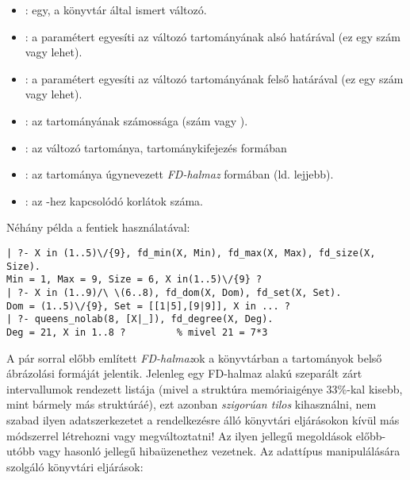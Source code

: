 \begin{itemize}
\item {}:  egy, a \clpfd könyvtár által ismert változó.
\item {}: a  paramétert egyesíti az 
változó tartományának alsó határával (ez egy szám vagy  lehet).
\item {}: a  paramétert egyesíti az 
változó tartományának felső határával (ez egy szám vagy  lehet).
\item {}:  az  tartományának számossága
(szám vagy ).
\item {}:  az  változó tartománya,
tartománykifejezés formában 
\item {}:  az  tartománya úgynevezett
\emph{FD-halmaz} formában (ld. lejjebb).
\item {}:  az -hez kapcsolódó korlátok
száma.
\end{itemize}

Néhány példa a fentiek használatával:

\begin{verbatim}
| ?- X in (1..5)\/{9}, fd_min(X, Min), fd_max(X, Max), fd_size(X, Size).
Min = 1, Max = 9, Size = 6, X in(1..5)\/{9} ? 
| ?- X in (1..9)/\ \(6..8), fd_dom(X, Dom), fd_set(X, Set).
Dom = (1..5)\/{9}, Set = [[1|5],[9|9]], X in ... ?
| ?- queens_nolab(8, [X|_]), fd_degree(X, Deg).
Deg = 21, X in 1..8 ?         % mivel 21 = 7*3
\end{verbatim}

A pár sorral előbb említett \emph{FD-halmaz}ok a \clpfd könyvtárban a
tartományok belső ábrázolási formáját jelentik. Jelenleg egy FD-halmaz
 alakú szeparált zárt intervallumok rendezett listája (mivel
a  struktúra memóriaigénye 33\%-kal kisebb, mint bármely más
 struktúráé), ezt azonban \emph{szigorúan tilos} kihasználni, nem
szabad ilyen adatszerkezetet a rendelkezésre álló könyvtári eljárásokon
kívül más módszerrel létrehozni vagy megváltoztatni! Az ilyen jellegű
megoldások előbb-utóbb  vagy hasonló jellegű
hibaüzenethez vezetnek.
\br
Az adattípus manipulálására szolgáló könyvtári eljárások:

